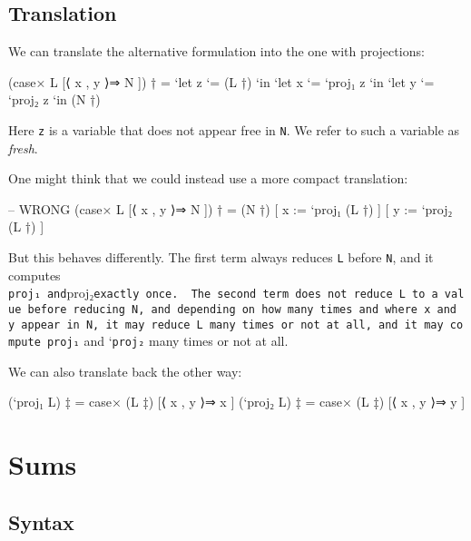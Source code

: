 \hypertarget{translation-1}{%
\subsection{Translation}\label{translation-1}}

We can translate the alternative formulation into the one with
projections:

\begin{myDisplay}
  (case× L [⟨ x , y ⟩⇒ N ]) †
=
  `let z `= (L †) `in
  `let x `= `proj₁ z `in
  `let y `= `proj₂ z `in
  (N †)
\end{myDisplay}

Here \texttt{z} is a variable that does not appear free in \texttt{N}.
We refer to such a variable as \emph{fresh}.

One might think that we could instead use a more compact translation:

\begin{myDisplay}
-- WRONG
  (case× L [⟨ x , y ⟩⇒ N ]) †
=
  (N †) [ x := `proj₁ (L †) ] [ y := `proj₂ (L †) ]
\end{myDisplay}

But this behaves differently. The first term always reduces \texttt{L}
before \texttt{N}, and it computes
\texttt{proj₁\textasciigrave{}\textasciigrave{}\ and}proj₂\texttt{exactly\ once.\ \ The\ second\ term\ does\ not\ reduce\ \textasciigrave{}L\textasciigrave{}\ to\ a\ value\ before\ reducing\ \textasciigrave{}N\textasciigrave{},\ and\ depending\ on\ how\ many\ times\ and\ where\ \textasciigrave{}x\textasciigrave{}\ and\ \textasciigrave{}y\textasciigrave{}\ appear\ in\ \textasciigrave{}N\textasciigrave{},\ it\ may\ reduce\ \textasciigrave{}L\textasciigrave{}\ many\ times\ or\ not\ at\ all,\ and\ it\ may\ compute\ \textasciigrave{}\textasciigrave{}\textasciigrave{}proj₁}
and `\texttt{proj₂} many times or not at all.

We can also translate back the other way:

\begin{myDisplay}
(`proj₁ L) ‡  =  case× (L ‡) [⟨ x , y ⟩⇒ x ]
(`proj₂ L) ‡  =  case× (L ‡) [⟨ x , y ⟩⇒ y ]
\end{myDisplay}

\hypertarget{More-sums}{%
\section{Sums}\label{More-sums}}

\hypertarget{syntax-4}{%
\subsection{Syntax}\label{syntax-4}}

